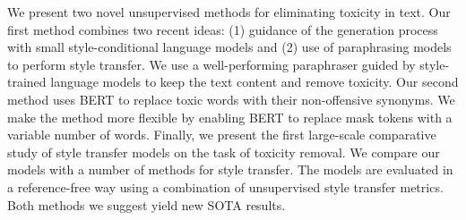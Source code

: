 We present two novel unsupervised methods for eliminating toxicity in text. Our first method combines two recent ideas: (1) guidance of the generation process with small style-conditional language models and (2) use of paraphrasing models to perform style transfer. We use a well-performing paraphraser guided by style-trained language models to keep the text content and remove toxicity. Our second method uses BERT to replace toxic words with their non-offensive synonyms. We make the method more flexible by enabling BERT to replace mask tokens with a variable number of words.  Finally, we present the first large-scale comparative study of style transfer models on the task of toxicity removal. We compare our models with a number of methods for style transfer. The models are evaluated in a reference-free way using a combination of unsupervised style transfer metrics. Both methods we suggest yield new SOTA results.
